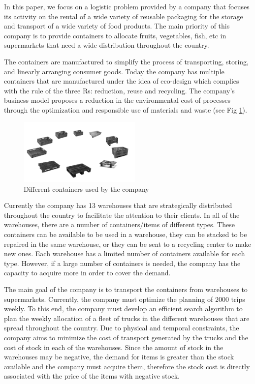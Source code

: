 \documentclass[letterpaper]{article} %
\begin{document}
In this paper, we focus on a logistic problem provided by a company that focuses its activity on the rental of a wide variety of reusable packaging for the storage and transport of a wide variety of food products. The main priority of this company is to provide containers to allocate fruits, vegetables, fish, etc in supermarkets that need a wide distribution throughout the country.

The containers are manufactured to simplify the process of transporting, storing, and linearly arranging consumer goods. Today the company has multiple containers that are manufactured under the idea of eco-design which complies with the rule of the three Rs: reduction, reuse and recycling. The company's business model proposes a reduction in the environmental cost of processes through the optimization and responsible use of materials and waste (see Fig \ref{fig:covers}).

\begin{figure}
    \includegraphics[width=6cm]{img/covers.png}
    \centering
    \caption{Different containers used by the company}
    \label{fig:covers}
\end{figure}

Currently the company has 13 warehouses that are strategically distributed throughout the country to facilitate the attention to their clients. In all of the warehouses, there are a number of containers/items of different types. These containers can be available to be used in a warehouse, they can be stacked to be repaired in the same warehouse, or they can be sent to a recycling center to make new ones. Each warehouse has a limited number of containers available for each type. However, if a large number of containers is needed, the company has the capacity to acquire more in order to cover the demand.

The main goal of the company is to transport the containers from warehouses to supermarkets. Currently, the company must optimize the planning of 2000 trips weekly. To this end, the company must develop an efficient search algorithm to plan the weekly allocation of a fleet of trucks in the different warehouses that are spread throughout the country. Due to physical and temporal constraints, the company aims to minimize the cost of transport generated by the trucks and the cost of stock in each of the warehouses. Since the amount of stock in the warehouses may be negative, the demand for items is greater than the stock available and the company must acquire them, therefore the stock cost is directly associated with the price of the items with negative stock.
\end{document}
